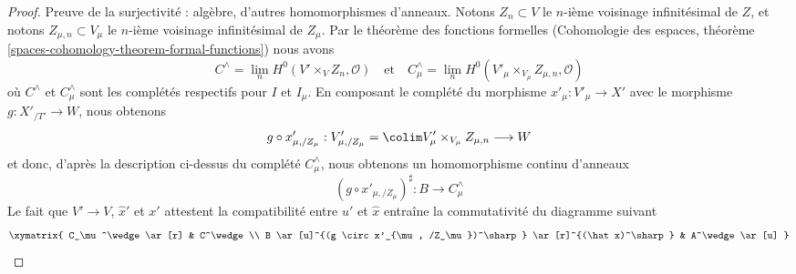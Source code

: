 \begin{proof}
\medskip\noindent
Preuve de la surjectivité : algèbre, d'autres homomorphismes d'anneaux.
Notons $Z_n \subset V$ le $n$-ième voisinage infinitésimal
de $Z$, et notons $Z_{\mu, n} \subset V_\mu$
le $n$-ième voisinage infinitésimal de $Z_\mu$.
Par le théorème des fonctions formelles
(Cohomologie des espaces, théorème
\ref{spaces-cohomology-theorem-formal-functions})
nous avons
$$
C^\wedge = \lim_n H^0(V' \times_V Z_n, \mathcal{O})
\quad\text{et}\quad
C_\mu^\wedge =
\lim_n H^0(V'_\mu \times_{V_\mu} Z_{\mu, n}, \mathcal{O})
$$
où $C^\wedge$ et $C_\mu^\wedge$ sont les complétés respectifs pour
$I$ et $I_\mu$.
En composant le complété du morphisme
$x'_\mu : V'_\mu \to X'$ avec le morphisme $g : X'_{/T'} \to W$, nous obtenons
$$
g \circ x'_{\mu, /Z_\mu} :
V'_{\mu, /Z_\mu} = \colim V_\mu' \times_{V_\mu} Z_{\mu, n}
\longrightarrow
W
$$
et donc, d'après la description ci-dessus du complété
$C_\mu^\wedge$, nous obtenons un homomorphisme continu d'anneaux
$$
(g \circ x'_{\mu, /Z_\mu})^\sharp : B \longrightarrow C_\mu^\wedge
$$
Le fait que $V' \to V$, $\hat x'$ et $x'$ attestent la compatibilité
entre $u'$ et $\hat x$ entraîne la
commutativité du diagramme suivant
$$
\xymatrix{
C_\mu^\wedge \ar[r] &
C^\wedge \\
B \ar[u]^{(g \circ x'_{\mu, /Z_\mu})^\sharp} \ar[r]^{(\hat x)^\sharp} &
A^\wedge \ar[u]
}
$$


\end{proof}
